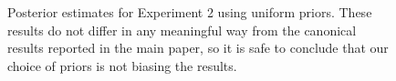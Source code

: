 \documentclass[doc,biblatex,floatsintext]{apa7}
\begin{document}
\begin{figure}
\vspace*{2pt}
\caption{Posterior estimates for Experiment 2 using uniform priors. These results do not differ in any meaningful way from the canonical results reported in the main paper, so it is safe to conclude that our choice of priors is not biasing the results.}
\label{supp3}
\end{figure}

\clearpage
\end{document}
